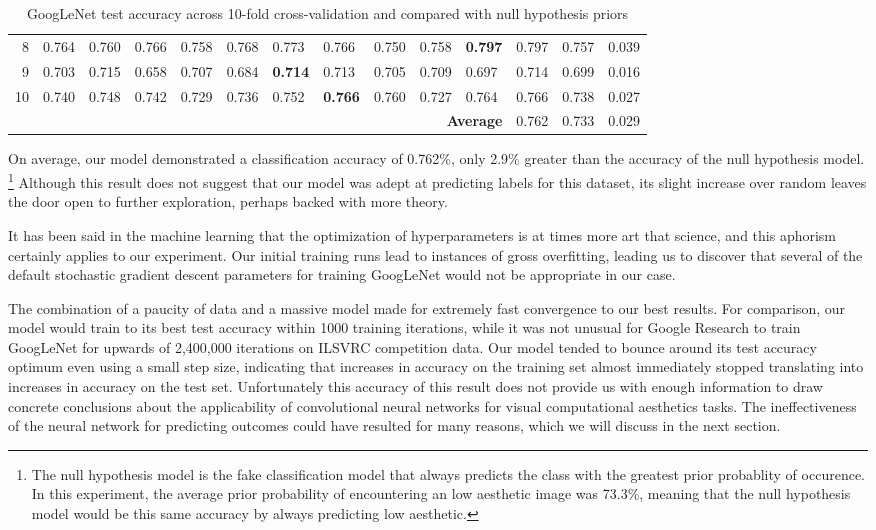 \documentclass[midd]{thesis}
\begin{document}
\begin{table}[h]
{\begin{tabular}{@{}rlllllllllllll@{}}
\multicolumn{1}{r|}{8} & 0.764 & 0.760 & 0.766 & 0.758 & 0.768 & 0.773 & 0.766 & 0.750 & 0.758 & \multicolumn{1}{l|}{\textbf{0.797}} & 0.797 & 0.757 & 0.039 \\
\multicolumn{1}{r|}{9} & 0.703 & 0.715 & 0.658 & 0.707 & 0.684 & \textbf{0.714} & 0.713 & 0.705 & 0.709 & \multicolumn{1}{l|}{0.697} & 0.714 & 0.699 & 0.016 \\
\multicolumn{1}{r|}{10} & 0.740 & 0.748 & 0.742 & 0.729 & 0.736 & 0.752 & \textbf{0.766} & 0.760 & 0.727 & \multicolumn{1}{l|}{0.764} & 0.766 & 0.738 & 0.027 \\ \midrule
\multicolumn{1}{l}{\textbf{}} &  &  &  &  &  &  &  & \multicolumn{3}{r|}{\textbf{Average}} & 0.762 & 0.733 & 0.029 \\ \bottomrule
\end{tabular}
}
\caption{GoogLeNet test accuracy across 10-fold cross-validation and compared with null hypothesis priors}
\label{results}
\end{table}

On average, our model demonstrated a classification accuracy of 0.762\%, only 2.9\% greater than the accuracy of the null hypothesis model. \footnote{The null hypothesis model is the fake classification model that always predicts the class with the greatest prior probablity of occurence. In this experiment, the average prior probability of encountering an low aesthetic image was 73.3\%, meaning that the null hypothesis model would be this same accuracy by always predicting low aesthetic.} Although this result does not suggest that our model was adept at predicting labels for this dataset, its slight increase over random leaves the door open to further exploration, perhaps backed with more theory.

It has been said in the machine learning that the optimization of hyperparameters is at times more art that science, and this aphorism certainly applies to our experiment. Our initial training runs lead to instances of gross overfitting, leading us to discover that several of the default stochastic gradient descent parameters for training GoogLeNet would not be appropriate in our case. 

The combination of a paucity of data and a massive model made for extremely fast convergence to our best results. For comparison, our model would train to its best test accuracy within 1000 training iterations, while it was not unusual for Google Research to train GoogLeNet for upwards of 2,400,000 iterations on ILSVRC competition data. Our model tended to bounce around its test accuracy optimum even using a small step size, indicating that increases in accuracy on the training set almost immediately stopped translating into increases in accuracy on the test set. Unfortunately this accuracy of this result does not provide us with enough information to draw concrete conclusions about the applicability of convolutional neural networks for visual computational aesthetics tasks. The ineffectiveness of the neural network for predicting outcomes could have resulted for many reasons, which we will discuss in the next section.
\end{document}
